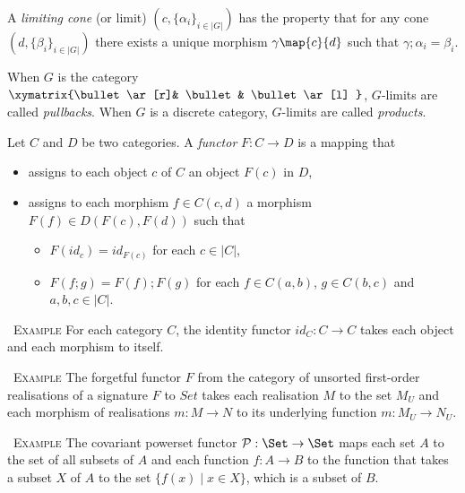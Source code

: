 \documentclass[10pt, a4paper]{isov2}
\renewenvironment{example}[0]{\ \newline \textsc{Example}\quad }{}
\begin{document}
\begin{definition}
A \emph{limiting cone} (or limit) $(c, \{\alpha_i\}_{i\in|G|})$ 
has the property that for any 
cone $(d, \{\beta_i\}_{i\in |G|})$ there exists a unique morphism 
$\gamma\map{c}{d}$ such that $\gamma;\alpha_i = \beta_i$.
 \end{definition}
 
 When $G$ is the category $\xymatrix{\bullet \ar[r]& \bullet & \bullet \ar[l] }$, $G$-limits are
called  \emph{pullbacks}.
 When $G$ is a discrete category,
 $G$-limits are called \emph{products}.



\begin{definition}
Let $C$ and $D$ be two categories. A \emph{functor} $F: C \to D $ is a mapping that 
\begin{itemize}
  \item assigns to each object $c$ of $C$ an object $F(c)$ in $D$,
  \item assigns to each morphism $f\in C(c,d)$ a morphism $F(f)\in D(F(c), F(d))$ such that 
   \begin{itemize}
     \item $F(\mathit{id}_c) = \mathit{id}_{F(c)} $ for each $c\in |C|$,
     \item $F(f;g) = F(f);F(g)$ for each $f\in C(a,b)$, $g\in C(b,c)$ and $a,b,c \in |C|$.
   \end{itemize}
\end{itemize}
\end{definition}

\begin{example}
For each category $C$, the identity functor $\mathit{id}_C : C \to C$ takes 
each object and each morphism to itself. 
\end{example}

\begin{example}
The forgetful functor $F$ from the category of unsorted first-order 
realisations of a 
signature $F$ to $Set$ takes each realisation $M$ to the set $M_U$ and each
morphism of realisations $m:M\to N$ to its underlying function $m:M_U \to N_U$.
\end{example}

\begin{example}
The covariant powerset functor $\mathcal{P} : \Set \to \Set$
maps each set $A$ to the set of all subsets of $A$ and each function $f:A \to B$
to the function that takes a subset $X$ of $A$ to the set $\{f(x) \mid x\in X\}$,
which is a subset of $B$. 
\end{example}
\end{document}
